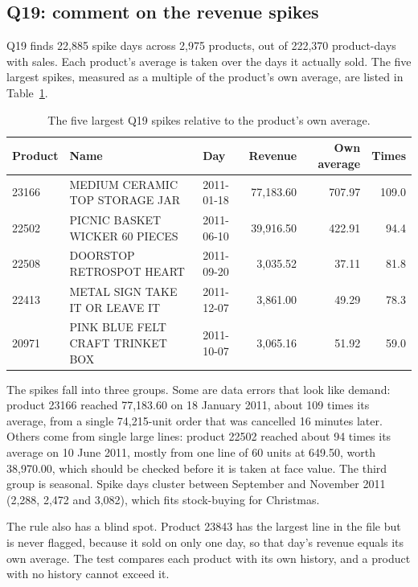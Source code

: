 \documentclass[11pt,a4paper]{article}
\begin{document}
\subsection{Q19: comment on the revenue spikes}

Q19 finds 22,885 spike days across 2,975 products, out of 222,370 product-days with sales. Each product's average is taken over the days it actually sold. The five largest spikes, measured as a multiple of the product's own average, are listed in Table~\ref{tab:spikes}.

\begin{table}[ht]\centering
\caption{The five largest Q19 spikes relative to the product's own average.}\label{tab:spikes}
\begin{tabular}{l>{\raggedright\arraybackslash}p{4.4cm}lrrr}
\toprule \textbf{Product} & \textbf{Name} & \textbf{Day} & \textbf{Revenue} & \textbf{Own average} & \textbf{Times} \\ \midrule
23166 & MEDIUM CERAMIC TOP STORAGE JAR & 2011-01-18 & 77,183.60 & 707.97 & 109.0 \\
22502 & PICNIC BASKET WICKER 60 PIECES & 2011-06-10 & 39,916.50 & 422.91 & 94.4 \\
22508 & DOORSTOP RETROSPOT HEART & 2011-09-20 & 3,035.52 & 37.11 & 81.8 \\
22413 & METAL SIGN TAKE IT OR LEAVE IT & 2011-12-07 & 3,861.00 & 49.29 & 78.3 \\
20971 & PINK BLUE FELT CRAFT TRINKET BOX & 2011-10-07 & 3,065.16 & 51.92 & 59.0 \\
\bottomrule\end{tabular}
\end{table}

The spikes fall into three groups. Some are data errors that look like demand: product 23166 reached 77,183.60 on 18 January 2011, about 109 times its average, from a single 74,215-unit order that was cancelled 16 minutes later. Others come from single large lines: product 22502 reached about 94 times its average on 10 June 2011, mostly from one line of 60 units at 649.50, worth 38,970.00, which should be checked before it is taken at face value. The third group is seasonal. Spike days cluster between September and November 2011 (2,288, 2,472 and 3,082), which fits stock-buying for Christmas.

The rule also has a blind spot. Product 23843 has the largest line in the file but is never flagged, because it sold on only one day, so that day's revenue equals its own average. The test compares each product with its own history, and a product with no history cannot exceed it.
\end{document}
